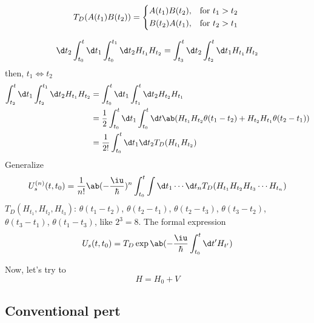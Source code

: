 \[
  T_D(A(t_1) B(t_2)) =
  \begin{cases*}
    A(t_1) B(t_2), & for $t_1 > t_2$\\
    B(t_2) A(t_1), & for $t_2 > t_1$
  \end{cases*}
\]
\begin{center}
\end{center}
\[
  \d t_2 \int _{t_0}^t \d t_1 \int_{t_0}^{t_1} \d t_2 H_{t_1} H_{t_2}
= \int_{t_3}^{t} \d t_2 \int_{t_2}^t \d t_1 H_{t_1} H_{t_2}
\]
then, $t_1 \Leftrightarrow t_2$
\begin{align*}
  \int_{t_2}^t \d t_1 \int_{t_2}^{t_1} \d t_2 H_{t_1} H_{t_2} &
= \int_{t_0}^t \d t_1 \int_{t_1}^{t} \d t_2 H_{t_2} H_{t_1}\\
& = \frac12 \int_{t_0}^t \d t_1 \int_{t_0}^t \d t
  \ab(H_{t_1} H_{t_2} \theta(t_1 - t_2) + H_{t_2} H_{t_1} \theta(t_2 - t_1))\\
& = \frac1{2!} \int_{t_0}^t \d t_1 \d t_2 T_D(H_{t_1} H_{t_2})
\end{align*}
Generalize
\begin{equation}
  U_s^{(n)}(t,t_0) = \frac1{n!} \ab(-\frac\iu\hbar)^n \int_{t_0}^t \int \d t_1 \cdots \d t_n T_D(H_{t_1} H_{t_2} H_{t_3} \cdots H_{t_n})
\end{equation}
$T_D(H_{t_1}, H_{t_2}, H_{t_3})$:
$\theta(t_1 - t_2)$, $\theta(t_2 - t_1)$,
$\theta(t_2 - t_3)$, $\theta(t_3 - t_2)$,
$\theta(t_3 - t_1)$, $\theta(t_1 - t_3)$, like $2^3 = 8$.
The formal expression
\begin{equation}
  U_s(t,t_0) = T_D \exp\ab(-\frac\iu\hbar \int_{t_0}^t \d t' H_{t'})
\end{equation}

Now, let's try to
\[
  H = H_0 + V
\]

\subsection{Conventional pert}

